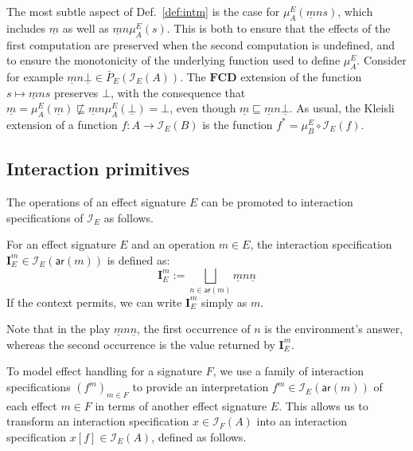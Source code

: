 \documentclass[sigplan,screen]{acmart}
\newcommand{\kw}[1]{\ensuremath{ \mathsf{#1} }}
\begin{document}
The most subtle aspect of Def.~\ref{def:intm}
is the case for $\mu^E_A(\underline{m} n s)$,
which includes $\underline{m}$ as well as $\underline{m} n \mu^E_A(s)$.
This is both
to ensure that the effects of the first computation are preserved
when the second computation is undefined, and
to ensure the monotonicity of the underlying function
used to define $\mu^E_A$.
Consider for example
$\underline{m} n \underline{\bot} \in \bar{P}_E(\mathcal{I}_E(A))$.
The $\mathbf{FCD}$ extension
of the function $s \mapsto \underline{m} n s$
preserves $\bot$,
with the consequence that
$\underline{m} = \mu^E_A(\underline{m}) \nsqsubseteq
 \underline{m} n \mu^E_A(\underline{\bot}) = \bot$,
even though
$\underline{m} \sqsubseteq \underline{m} n \underline{\bot}$.
%
As usual,
the Kleisli extension of a function $f : A \rightarrow \mathcal{I}_E(B)$
is the function $f^* = \mu^E_B \circ \mathcal{I}_E(f)$.


\subsection{Interaction primitives} %

The operations of an effect signature $E$
can be promoted to interaction specifications of $\mathcal{I}_E$
as follows.

\begin{definition}
For an effect signature $E$ and
an operation $m \in E$,
the interaction specification
$\mathbf{I}_E^m \in \mathcal{I}_E(\kw{ar}(m))$
is defined as:
\[
  \mathbf{I}_E^m :=
    \bigsqcup_{n \in \kw{ar}(m)} \underline{m} n \underline{n}
\]
If the context permits,
we can write $\mathbf{I}_E^m$ simply as $m$.
\end{definition}
Note that in the play $\underline{m} n \underline{n}$,
the first occurrence of $n$ is the environment's answer,
whereas the second occurrence is the value returned by $\mathbf{I}_E^m$.

To model effect handling for a signature $F$,
we use a family of interaction specifications
$(f^m)_{m \in F}$
to provide an interpretation $f^m \in \mathcal{I}_E(\kw{ar}(m))$
of each effect $m \in F$
in terms of another effect signature $E$.
This allows us to transform an interaction specification
$x \in \mathcal{I}_F(A)$
into an interaction specification
$x[f] \in \mathcal{I}_E(A)$,
defined as follows.
\end{document}
